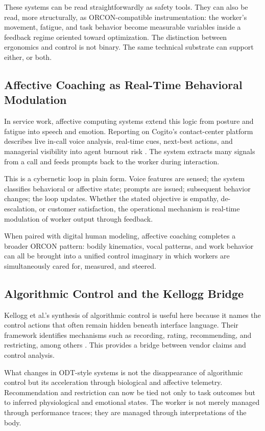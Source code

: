 \documentclass[runningheads]{llncs}
\begin{document}
These systems can be read straightforwardly as safety tools. They can also be read, more structurally, as ORCON-compatible instrumentation: the worker's movement, fatigue, and task behavior become measurable variables inside a feedback regime oriented toward optimization. The distinction between ergonomics and control is not binary. The same technical substrate can support either, or both.

\subsection{Affective Coaching as Real-Time Behavioral Modulation}

In service work, affective computing systems extend this logic from posture and fatigue into speech and emotion. Reporting on Cogito's contact-center platform describes live in-call voice analysis, real-time cues, next-best actions, and managerial visibility into agent burnout risk \cite{cxtoday2022cogito}. The system extracts many signals from a call and feeds prompts back to the worker during interaction.

This is a cybernetic loop in plain form. Voice features are sensed; the system classifies behavioral or affective state; prompts are issued; subsequent behavior changes; the loop updates. Whether the stated objective is empathy, de-escalation, or customer satisfaction, the operational mechanism is real-time modulation of worker output through feedback.

When paired with digital human modeling, affective coaching completes a broader ORCON pattern: bodily kinematics, vocal patterns, and work behavior can all be brought into a unified control imaginary in which workers are simultaneously cared for, measured, and steered.

\subsection{Algorithmic Control and the Kellogg Bridge}

Kellogg et al.'s synthesis of algorithmic control is useful here because it names the control actions that often remain hidden beneath interface language. Their framework identifies mechanisms such as recording, rating, recommending, and restricting, among others \cite{kellogg2020algorithms}. This provides a bridge between vendor claims and control analysis.

What changes in ODT-style systems is not the disappearance of algorithmic control but its acceleration through biological and affective telemetry. Recommendation and restriction can now be tied not only to task outcomes but to inferred physiological and emotional states. The worker is not merely managed through performance traces; they are managed through interpretations of the body.
\end{document}
